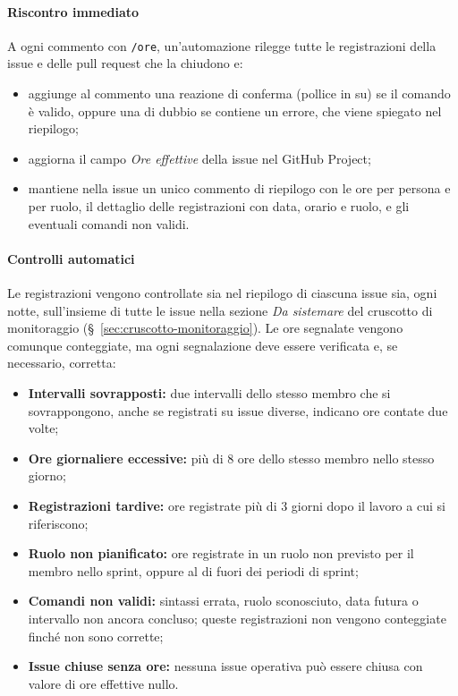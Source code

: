 \documentclass[documento]{gpt}
\begin{document}
	\paragraph{Riscontro immediato}
	A ogni commento con \texttt{/ore}, un'automazione rilegge tutte le registrazioni della issue e delle pull request che la chiudono e:
	\begin{itemize}
		\item aggiunge al commento una reazione di conferma (pollice in su) se il comando è valido, oppure una di dubbio se contiene un errore, che viene spiegato nel riepilogo;
		\item aggiorna il campo \textit{Ore effettive} della issue nel GitHub Project;
		\item mantiene nella issue un unico commento di riepilogo con le ore per persona e per ruolo, il dettaglio delle registrazioni con data, orario e ruolo, e gli eventuali comandi non validi.
	\end{itemize}
	
	\paragraph{Controlli automatici}
	Le registrazioni vengono controllate sia nel riepilogo di ciascuna issue sia, ogni notte, sull'insieme di tutte le issue nella sezione \textit{Da sistemare} del cruscotto di monitoraggio (\S~\ref{sec:cruscotto-monitoraggio}). Le ore segnalate vengono comunque conteggiate, ma ogni segnalazione deve essere verificata e, se necessario, corretta:
	\begin{itemize}
		\item \textbf{Intervalli sovrapposti:} due intervalli dello stesso membro che si sovrappongono, anche se registrati su issue diverse, indicano ore contate due volte;
		\item \textbf{Ore giornaliere eccessive:} più di 8 ore dello stesso membro nello stesso giorno;
		\item \textbf{Registrazioni tardive:} ore registrate più di 3 giorni dopo il lavoro a cui si riferiscono;
		\item \textbf{Ruolo non pianificato:} ore registrate in un ruolo non previsto per il membro nello sprint, oppure al di fuori dei periodi di sprint;
		\item \textbf{Comandi non validi:} sintassi errata, ruolo sconosciuto, data futura o intervallo non ancora concluso; queste registrazioni non vengono conteggiate finché non sono corrette;
		\item \textbf{Issue chiuse senza ore:} nessuna issue operativa può essere chiusa con valore di ore effettive nullo.
	\end{itemize}
	
\end{document}
